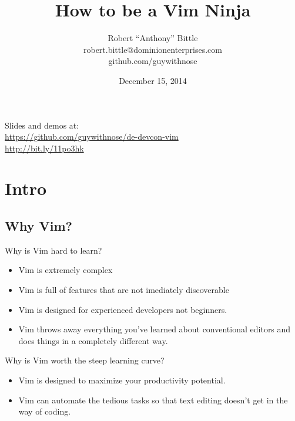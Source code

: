 \documentclass{beamer}
\title[How to be a Vim Ninja]{How to be a Vim Ninja}
\author{\hspace{12pt}Robert “Anthony” Bittle\hspace{12pt}\\\hspace{12pt}robert.bittle@dominionenterprises.com\hspace{12pt}\\\hspace{12pt}github.com/guywithnose\hspace{12pt}}
\date{December 15, 2014}
\begin{document}
    \begin{frame}
        \titlepage
        Slides and demos at:\\
        \href{https://github.com/guywithnose/de-devcon-vim}{https://github.com/guywithnose/de-devcon-vim}\\
        \href{http://bit.ly/11po3hk}{http://bit.ly/11po3hk}
    \end{frame}

    \section{Intro}
    \subsection{Why Vim?}
    \begin{frame}{Why is Vim hard to learn?}
        \begin{itemize}
            \item Vim is extremely complex %
            \item Vim is full of features that are not imediately discoverable
            \item Vim is designed for experienced developers not beginners.
            \item Vim throws away everything you've learned about conventional editors and does things in a completely different way.
        \end{itemize}
    \end{frame}
    \begin{frame}{Why is Vim worth the steep learning curve?}
        \begin{itemize}
            \item Vim is designed to maximize your productivity potential.
            \item Vim can automate the tedious tasks so that text editing doesn't get in the way of coding.
        \end{itemize}
    \end{frame}
\end{document}
